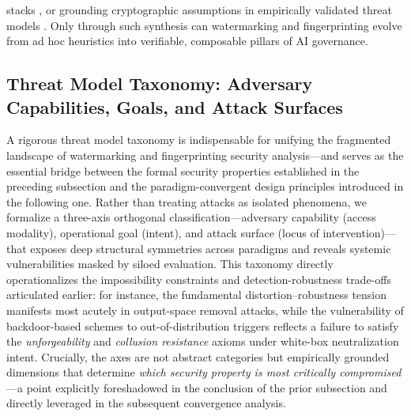 \documentclass[11pt,a4paper]{article}
\begin{document}
stacks \cite{doi:10.1038/s41586-024-08025-4}, or grounding cryptographic assumptions in empirically validated threat models \cite{arxiv:2402.19361,doi:10.1145/3618257.3624845}. Only through such synthesis can watermarking and fingerprinting evolve from ad hoc heuristics into verifiable, composable pillars of AI governance.


\subsection{Threat Model Taxonomy: Adversary Capabilities, Goals, and Attack Surfaces}


A rigorous threat model taxonomy is indispensable for unifying the fragmented landscape of watermarking and fingerprinting security analysis---and serves as the essential bridge between the formal security properties established in the preceding subsection and the paradigm-convergent design principles introduced in the following one. Rather than treating attacks as isolated phenomena, we formalize a three-axis orthogonal classification---adversary capability (access modality), operational goal (intent), and attack surface (locus of intervention)---that exposes deep structural symmetries across paradigms and reveals systemic vulnerabilities masked by siloed evaluation. This taxonomy directly operationalizes the impossibility constraints and detection-robustness trade-offs articulated earlier: for instance, the fundamental distortion--robustness tension \cite{arxiv:2505.06827} manifests most acutely in output-space removal attacks, while the vulnerability of backdoor-based schemes to out-of-distribution triggers \cite{arxiv:2409.06130} reflects a failure to satisfy the \emph{unforgeability} and \emph{collusion resistance} axioms under white-box neutralization intent. Crucially, the axes are not abstract categories but empirically grounded dimensions that determine \emph{which security property is most critically compromised}---a point explicitly foreshadowed in the conclusion of the prior subsection and directly leveraged in the subsequent convergence analysis.
\end{document}
